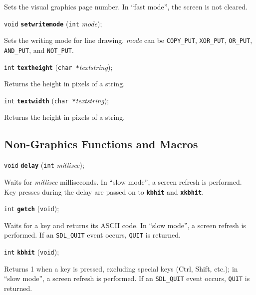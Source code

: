 \documentclass[a4paper,11pt]{article}
\newcommand{\V}{\texttt{void}}      %
\newcommand{\I}{\texttt{int}}       %
\newcommand{\C}{\texttt{char *}}    %
\newcommand{\func}[1]{\textbf{\texttt{#1}}}  %
\newcommand{\A}[1]{\emph{#1}}       %
\newcommand{\T}[1]{\texttt{#1}}     %
\newenvironment{bgi}
{ %
  \begin{snugshade}
}
{ %
  \end{snugshade}
}
\begin{document}
Sets the visual graphics page number. In ``fast mode'', the screen is
not cleared.


\begin{bgi}
\V{} \func{setwritemode} (\I{} \A{mode});
\end{bgi}

Sets the writing mode for line drawing. \A{mode} can be \T{COPY\_PUT},
\T{XOR\-\_PUT}, \T{OR\_PUT}, \T{AND\_PUT}, and \T{NOT\_PUT}.


\begin{bgi}
\I{} \func{textheight} (\C{}\A{textstring});
\end{bgi}

Returns the height in pixels of a string.


\begin{bgi}
\I{} \func{textwidth} (\C{}\A{textstring});
\end{bgi}

Returns the height in pixels of a string.


\subsection{Non-Graphics Functions and Macros}

\begin{bgi}
\V{} \func{delay} (\I{} \A{millisec});
\end{bgi}

Waits for \A{millisec} milliseconds. In ``slow mode'', a screen
refresh is performed. Key presses during the delay are passed on to
\func{kbhit} and \func{xkbhit}.


\begin{bgi}
\I{} \func{getch} (\V{});
\end{bgi}

Waits for a key and returns its ASCII code. In ``slow mode'', a screen
refresh is performed. If an \T{SDL\_QUIT} event occurs, \T{QUIT} is
returned.


\begin{bgi}
\I{} \func{kbhit} (\V{});
\end{bgi}

Returns 1 when a key is pressed, excluding special keys (Ctrl, Shift,
etc.); in ``slow mode'', a screen refresh is performed. If an
\T{SDL\_QUIT} event occurs, \T{QUIT} is returned.
\end{document}
